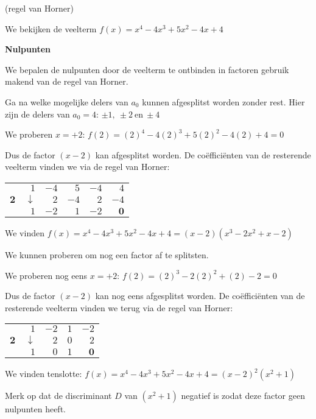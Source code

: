 \begin{voorbeeld}
	 (regel van Horner)

We bekijken de veelterm $f(x)=x^{4}-4x^{3}+5x^{2}-4x+4$

\textbf{Nulpunten}

We bepalen de nulpunten door de veelterm te ontbinden in
factoren gebruik makend van de regel van Horner.

Ga na welke mogelijke delers van $a_{0}$ kunnen afgesplitst
worden zonder rest. Hier zijn de delers van $a_{0}=4$: $\pm1,\:\pm2\:\textrm{en}\:\pm4$

We proberen $x=+2$: $f(2)=(2)^{4}-4(2)^{3}+5(2)^{2}-4(2)+4=0$

Dus de factor $(x-2)$ kan afgesplitst worden. De co\"effici\"enten
van de resterende veelterm vinden we via de regel van Horner:

\begin{center}
\begin{tabular}{r|rrrrr}
	& $1$ & $-4$ & $5$ & $-4$ & $4$\\
	$\mathbf{2}$ & $\downarrow$ & $2$ & $-4$ & $2$ & $-4$\\
	\hline  
	& $1$ & $-2$ & $1$ & \multicolumn{1}{r||}{$-2$} & $\mathbf{0}$\\
\end{tabular}	
\end{center}

We vinden $f(x)=x^{4}-4x^{3}+5x^{2}-4x+4=(x-2)(x^{3}-2x^{2}+x-2)$

We kunnen proberen om nog een factor af te splitsten.

We proberen nog eens $x=+2$: $f(2)=(2)^{3}-2(2)^{2}+(2)-2=0$

Dus de factor $(x-2)$ kan nog eens afgesplitst worden.
De co\"effici\"enten van de resterende veelterm vinden we terug via de
regel van Horner:

\begin{center}
\begin{tabular}{r|rrrr}
	& $1$ & $-2$ & $1$ & $-2$\\
	$\mathbf{2}$ & $\downarrow$ & $2$ & $0$ & $2$\\
	\hline 
	& $1$ & $0$ & \multicolumn{1}{r||}{$1$} & $\mathbf{0}$\\
\end{tabular}
\end{center}

We vinden tenslotte: $f(x)=x^{4}-4x^{3}+5x^{2}-4x+4=(x-2)^{2}(x^{2}+1)$

Merk op dat de discriminant $D$ van $(x^{2}+1)$ negatief
is zodat deze factor geen nulpunten heeft.


\end{voorbeeld}
